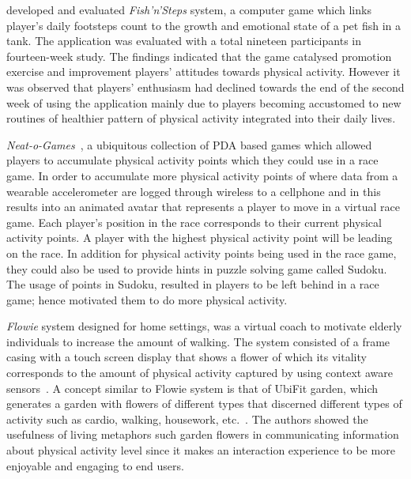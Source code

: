 \cite{lin2006:fish} developed and evaluated \emph{{Fish'n'Steps}} system, a computer game which links player's daily footsteps count to the growth and emotional state of a pet fish in a tank. The application was evaluated with a total nineteen participants in fourteen-week study. The findings indicated that the game catalysed promotion exercise and improvement players’ attitudes towards physical activity. However it was observed that players' enthusiasm had declined towards the end of the second week of using the application mainly due to players becoming accustomed to new routines of healthier pattern of physical activity integrated into their daily lives.
  
\emph{{Neat-o-Games}}~\citep{fujiki2008neat}, a ubiquitous collection of PDA based games which allowed players to accumulate physical activity points which they could use in a race game. In order to accumulate more physical activity points of where data from a wearable accelerometer are logged through wireless to a cellphone and in this results into an animated avatar that represents a player to move in a virtual race game. Each player's position in the race corresponds to their current physical activity points. A player with the highest physical activity point will be leading on the race. In addition for physical activity points being used in the race game, they could also be used to provide hints in puzzle solving game called Sudoku. The usage of points in Sudoku, resulted in players to be left behind in a race game; hence motivated them to do more physical activity.

\emph{Flowie} system designed for home settings, was a virtual coach to motivate elderly individuals to increase the amount of walking. The system consisted of a frame casing with a touch screen display that shows a flower of which its vitality corresponds to the amount of physical activity captured by using context aware sensors~\citep{albaina2009flowie}. A concept similar to Flowie system is that of UbiFit garden, which generates a garden with flowers of different types that discerned different types of activity such as cardio, walking, housework, etc.~\citep{klasnja2009:using}. The authors showed the usefulness of living metaphors
such garden flowers in communicating information about physical activity level since it makes an interaction experience to be more enjoyable and engaging to end users.

